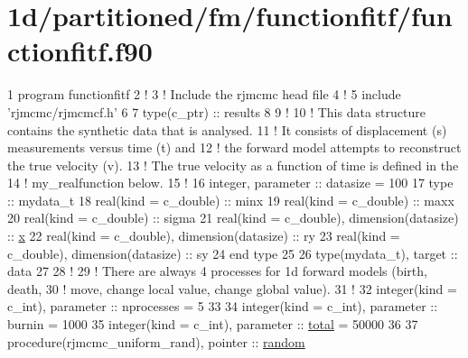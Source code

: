 \hypertarget{1d_2partitioned_2fm_2functionfitf_2functionfitf_8f90-example}{}\section{1d/partitioned/fm/functionfitf/functionfitf.\+f90}

\begin{DoxyCodeInclude}
1 \textcolor{keyword}{program} functionfitf
2 \textcolor{comment}{!}
3 \textcolor{comment}{! Include the rjmcmc head file}
4 \textcolor{comment}{!}
5 include \textcolor{stringliteral}{'rjmcmc/rjmcmcf.h'}
6 
7 \textcolor{keywordtype}{type}(c\_ptr) :: results
8 
9 \textcolor{comment}{!}
10 \textcolor{comment}{! This data structure contains the synthetic data that is analysed.}
11 \textcolor{comment}{! It consists of displacement (s) measurements versus time (t) and }
12 \textcolor{comment}{! the forward model attempts to reconstruct the true velocity (v).}
13 \textcolor{comment}{! The true velocity as a function of time is defined in the }
14 \textcolor{comment}{! my\_realfunction below.}
15 \textcolor{comment}{!}
16 \textcolor{keywordtype}{integer}, \textcolor{keywordtype}{parameter} :: datasize = 100
17 \textcolor{keyword}{type} :: mydata\_t
18    \textcolor{keywordtype}{real(kind = c\_double)} :: minx
19    \textcolor{keywordtype}{real(kind = c\_double)} :: maxx
20    \textcolor{keywordtype}{real(kind = c\_double)} :: sigma
21    \textcolor{keywordtype}{real(kind = c\_double)}, \textcolor{keywordtype}{dimension(datasize)} :: \hyperlink{wellrng_8c_a676e0da0ef83bbbdf42538e54b97506b}{x}
22    \textcolor{keywordtype}{real(kind = c\_double)}, \textcolor{keywordtype}{dimension(datasize)} :: ry
23    \textcolor{keywordtype}{real(kind = c\_double)}, \textcolor{keywordtype}{dimension(datasize)} :: sy
24 \textcolor{keyword}{end type}
25 
26 \textcolor{keywordtype}{type}(mydata\_t), \textcolor{keywordtype}{target} :: data
27 
28 \textcolor{comment}{!}
29 \textcolor{comment}{! There are always 4 processes for 1d forward models (birth, death,}
30 \textcolor{comment}{! move, change local value, change global value).}
31 \textcolor{comment}{!}
32 \textcolor{keywordtype}{integer(kind = c\_int)}, \textcolor{keywordtype}{parameter} :: nprocesses = 5
33 
34 \textcolor{keywordtype}{integer(kind = c\_int)}, \textcolor{keywordtype}{parameter} :: burnin = 1000
35 \textcolor{keywordtype}{integer(kind = c\_int)}, \textcolor{keywordtype}{parameter} :: \hyperlink{rjmcmcf__mpi_8h_a1829e955eab35ef63200105c2de1ad94}{total} = 50000
36 
37 \textcolor{keywordtype}{procedure}(rjmcmc\_uniform\_rand), \textcolor{keywordtype}{pointer} :: \hyperlink{rjmcmcf__mpi_8h_a361f30102277b1d490d4edc190afccf6}{random}

\end{DoxyCodeInclude}
